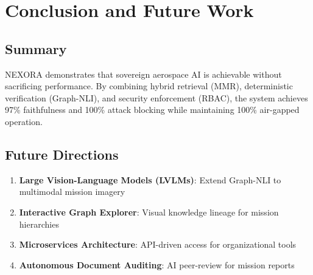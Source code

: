 \documentclass[journal,12pt,twocolumn]{IEEEtran}
\begin{document}
\section{Conclusion and Future Work}

\subsection{Summary}

NEXORA demonstrates that sovereign aerospace AI is achievable without sacrificing performance. By combining hybrid retrieval (MMR), deterministic verification (Graph-NLI), and security enforcement (RBAC), the system achieves 97\% faithfulness and 100\% attack blocking while maintaining 100\% air-gapped operation.

\subsection{Future Directions}

\begin{enumerate}
\item \textbf{Large Vision-Language Models (LVLMs)}: Extend Graph-NLI to multimodal mission imagery
\item \textbf{Interactive Graph Explorer}: Visual knowledge lineage for mission hierarchies
\item \textbf{Microservices Architecture}: API-driven access for organizational tools
\item \textbf{Autonomous Document Auditing}: AI peer-review for mission reports
\end{enumerate}
\end{document}

